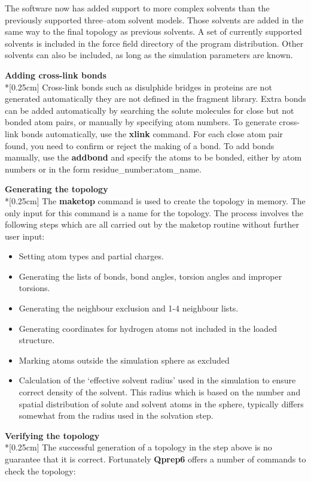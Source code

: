 \documentclass[a4paper,11pt]{article}
\begin{document}
The software now has added support to more complex solvents than
the previously supported three--atom solvent models. Those solvents
are added in the same way to the final topology as previous solvents.
A set of currently supported solvents is included in the force field
directory of the program distribution. Other solvents can also be included,
as long as the simulation parameters are known.

\textbf{Adding cross-link bonds}\\*[0.25cm] Cross-link bonds such
as disulphide bridges in proteins are not generated automatically
{\-} they are not defined in the fragment library. Extra bonds can
be added automatically by searching the solute molecules for close
but not bonded atom pairs, or manually by specifying atom numbers.
To generate cross-link bonds automatically, use the \textbf{xlink}
command. For each close atom pair found, you need to confirm or
reject the making of a bond. To add bonds manually, use the
\textbf{addbond} and specify the atoms to be bonded, either by
atom numbers or in the form residue{\_}number:atom{\_}name.

\textbf{Generating the topology}\\*[0.25cm] The \textbf{maketop}
command is used to create the topology in memory. The only input
for this command is a name for the topology. The process involves
the following steps which are all carried out by the maketop
routine without further user input:

\begin{itemize}
\item Setting atom types and partial charges.
\item Generating the lists of bonds, bond angles, torsion angles and improper torsions.
\item Generating the neighbour exclusion and 1-4 neighbour lists.
\item Generating coordinates for hydrogen atoms not included in the loaded structure.
\item Marking atoms outside the simulation sphere as excluded
\item Calculation of the `effective solvent radius' used in the
simulation to ensure correct density of the solvent. This radius
which is based on the number and spatial distribution of solute
and solvent atoms in the sphere, typically differs somewhat from
the radius used in the solvation step.
\end{itemize}

\textbf{Verifying the topology}\\*[0.25cm] The successful
generation of a topology in the step above is no guarantee that it
is correct. Fortunately \textbf{Qprep6} offers a number of commands to check
the topology:
\end{document}
